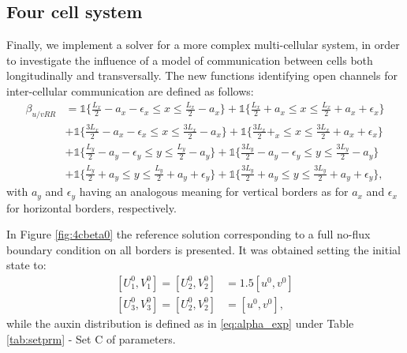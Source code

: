 \subsection{Four cell system}
Finally, we implement a solver for a more complex multi-cellular system, in order to investigate the influence of a model of communication between cells both longitudinally and transversally.
The new functions identifying open channels for inter-cellular communication are defined as follows:
\begin{equation}\begin{aligned}
   \beta_{u/vRR} & = \mathbb{1} \Big\{ \frac{L_x}{2} - a_x - \epsilon_x \leq x \leq \frac{L_x}{2} - a_x \Big\} + \mathbb{1} \Big\{ \frac{L_x}{2}+a_x \leq x \leq \frac{L_x}{2} + a_x+\epsilon_x \Big\} \\
   & + \mathbb{1} \Big\{ \frac{3L_x}{2}-a_x-\epsilon_x \leq x \leq \frac{3L_x}{2} - a_x \Big\}
   + \mathbb{1} \Big\{ \frac{3L_x}{2}+_x \leq x \leq \frac{3L_x}{2} + a_x+\epsilon_x \Big\} \\
   & + \mathbb{1} \Big\{ \frac{L_y}{2}-a_y-\epsilon_y \leq y \leq \frac{L_y}{2} - a_y \Big\} + \mathbb{1} \Big\{ \frac{3L_y}{2}-a_y-\epsilon_y \leq y \leq \frac{3L_y}{2} - a_y \Big\} \\
   & + \mathbb{1} \Big\{ \frac{L_y}{2}+a_y \leq y \leq \frac{L_y}{2} + a_y +\epsilon_y \Big\} + \mathbb{1} \Big\{ \frac{3L_y}{2}+a_y \leq y \leq \frac{3L_y}{2} + a_y +\epsilon_y \Big\},
\end{aligned}\end{equation}
with $a_y$ and $\epsilon_y$ having an analogous meaning for vertical borders as for $a_x$ and $\epsilon_x$ for horizontal borders, respectively.

In Figure \ref{fig:4cbeta0} the reference solution corresponding to a full no-flux boundary condition on all borders is presented. It was obtained setting the initial state to:
\begin{equation}\label{eq:initstate4} \begin{aligned}
    \left[ U_1^0, V_1^0 \right] = \left[ U_2^0, V_2^0 \right] & = 1.5 \left[u^0,v^0 \right] \\
    \left[ U_3^0, V_3^0 \right] = \left[ U_2^0, V_2^0 \right] & = \left[u^0,v^0 \right],
\end{aligned} \end{equation}
while the auxin distribution is defined as in \eqref{eq:alpha_exp} under Table \ref{tab:setprm} - Set C of parameters.

